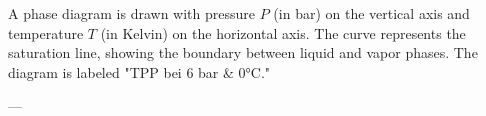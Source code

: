 A phase diagram is drawn with pressure \( P \) (in bar) on the vertical axis and temperature \( T \) (in Kelvin) on the horizontal axis. The curve represents the saturation line, showing the boundary between liquid and vapor phases. The diagram is labeled "TPP bei 6 bar & 0°C."

---